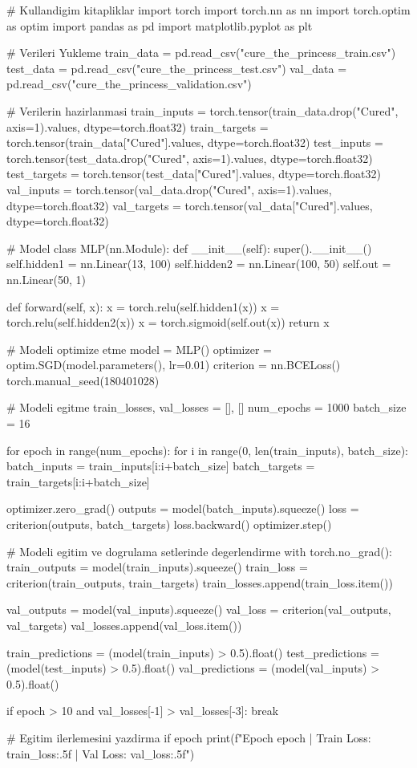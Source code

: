 \documentclass[11pt]{article}
\begin{document}
\begin{python}
# Kullandigim kitapliklar
import torch
import torch.nn as nn
import torch.optim as optim
import pandas as pd
import matplotlib.pyplot as plt

# Verileri Yukleme
train_data = pd.read_csv("cure_the_princess_train.csv")
test_data = pd.read_csv("cure_the_princess_test.csv")
val_data = pd.read_csv("cure_the_princess_validation.csv")

# Verilerin hazirlanmasi
train_inputs = torch.tensor(train_data.drop("Cured", axis=1).values, dtype=torch.float32)
train_targets = torch.tensor(train_data["Cured"].values, dtype=torch.float32)
test_inputs = torch.tensor(test_data.drop("Cured", axis=1).values, dtype=torch.float32)
test_targets = torch.tensor(test_data["Cured"].values, dtype=torch.float32)
val_inputs = torch.tensor(val_data.drop("Cured", axis=1).values, dtype=torch.float32)
val_targets = torch.tensor(val_data["Cured"].values, dtype=torch.float32)

# Model
class MLP(nn.Module):
    def __init__(self):
        super().__init__()
        self.hidden1 = nn.Linear(13, 100)
        self.hidden2 = nn.Linear(100, 50)
        self.out = nn.Linear(50, 1)

    def forward(self, x):
        x = torch.relu(self.hidden1(x))
        x = torch.relu(self.hidden2(x))
        x = torch.sigmoid(self.out(x))
        return x

        # Modeli optimize etme
model = MLP()
optimizer = optim.SGD(model.parameters(), lr=0.01)
criterion = nn.BCELoss()
torch.manual_seed(180401028)

# Modeli egitme
train_losses, val_losses = [], []
num_epochs = 1000
batch_size = 16

for epoch in range(num_epochs):
    for i in range(0, len(train_inputs), batch_size):
        batch_inputs = train_inputs[i:i+batch_size]
        batch_targets = train_targets[i:i+batch_size]

        optimizer.zero_grad()
        outputs = model(batch_inputs).squeeze()
        loss = criterion(outputs, batch_targets)
        loss.backward()
        optimizer.step()

    # Modeli egitim ve dogrulama setlerinde degerlendirme
    with torch.no_grad():
        train_outputs = model(train_inputs).squeeze()
        train_loss = criterion(train_outputs, train_targets)
        train_losses.append(train_loss.item())

        val_outputs = model(val_inputs).squeeze()
        val_loss = criterion(val_outputs, val_targets)
        val_losses.append(val_loss.item())

        train_predictions = (model(train_inputs) > 0.5).float()
        test_predictions = (model(test_inputs) > 0.5).float()
        val_predictions = (model(val_inputs) > 0.5).float()

    
    if epoch > 10 and val_losses[-1] > val_losses[-3]:
        break

    # Egitim ilerlemesini yazdirma
    if epoch %
        print(f"Epoch {epoch} | Train Loss: {train_loss:.5f} | Val Loss: {val_loss:.5f}")

\end{python}
\end{document}
